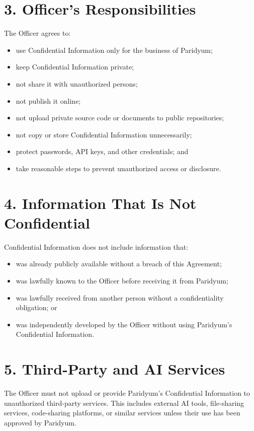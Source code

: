 \documentclass{paridyum}
\begin{document}
\section*{3. Officer's Responsibilities}
The Officer agrees to:
\begin{itemize}[leftmargin=*, noitemsep]
    \item use Confidential Information only for the business of Paridyum;
    \item keep Confidential Information private;
    \item not share it with unauthorized persons;
    \item not publish it online;
    \item not upload private source code or documents to public repositories;
    \item not copy or store Confidential Information unnecessarily;
    \item protect passwords, API keys, and other credentials; and
    \item take reasonable steps to prevent unauthorized access or disclosure.
\end{itemize}

\section*{4. Information That Is Not Confidential}
Confidential Information does not include information that:
\begin{itemize}[leftmargin=*, noitemsep]
    \item was already publicly available without a breach of this Agreement;
    \item was lawfully known to the Officer before receiving it from Paridyum;
    \item was lawfully received from another person without a confidentiality
          obligation; or
    \item was independently developed by the Officer without using Paridyum's
          Confidential Information.
\end{itemize}

\section*{5. Third-Party and AI Services}
The Officer must not upload or provide Paridyum's Confidential Information to
unauthorized third-party services. This includes external AI tools, file-sharing
services, code-sharing platforms, or similar services unless their use has been
approved by Paridyum.
\end{document}
